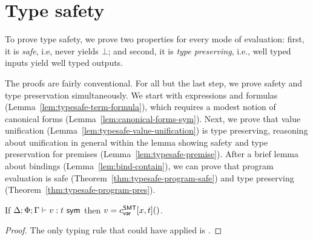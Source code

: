 \documentclass[acmsmall,screen,nonacm]{acmart}
\theoremstyle{definition}
\begin{document}
\section{Type safety}
\label{sec:metatheory-safety}

To prove type safety, we prove two properties for every mode of evaluation:
%
first, it is \emph{safe}, i.e, never yields $\bot$;
%
and second, it is \emph{type preserving}, i.e., well typed inputs yield
well typed outputs.

The proofs are fairly conventional. For all but the last step, we
prove safety and type preservation simultaneously.
%
We start with expressions and formulas
(Lemma~\ref{lem:typesafe-term-formula}), which requires a modest
notion of canonical forms (Lemma~\ref{lem:canonical-forms-sym}).
%
Next, we prove that value unification
(Lemma~\ref{lem:typesafe-value-unification}) is type preserving,
reasoning about unification in general within the lemma showing safety
and type preservation for premises (Lemma~\ref{lem:typesafe-premise}).
%
After a brief lemma about bindings (Lemma~\ref{lem:bind-contain}), we
can prove that program evaluation is safe
(Theorem~\ref{thm:typesafe-program-safe}) and type preserving
(Theorem~\ref{thm:typesafe-program-pres}).

\begin{lemma}
\label{lem:canonical-forms-sym}
If $\Delta; \Phi; \Gamma \vdash v : {t} ~ \mathsf{sym}$ then $v = c^\mathsf{SMT}_{\mathsf{var}}[x, t]()$.
%
\begin{proof}
  The only typing rule that could have applied is .
\end{proof}
\end{lemma}
\end{document}
